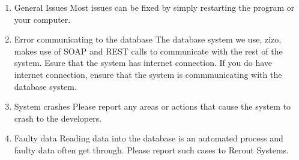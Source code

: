 \documentclass[a4paper,10pt]{article}
\begin{document}
	\begin{enumerate}
		\item General Issues
			Most issues can be fixed by simply restarting the program or your computer. 
		\item Error communicating to the database
			The database system we use, zizo, makes use of SOAP and REST calls to communicate with the rest of the system. Esure that the system has internet connection. If you do have internet connection, ensure that the system is commmunicating with the database system. 
		\item System crashes
			Please report any areas or actions that cause the system to crash to the developers.
		\item Faulty data
			Reading data into the database is an automated process and faulty data often get through. Please report such cases to Rerout Systems.
	\end{enumerate}
	
\end{document}
